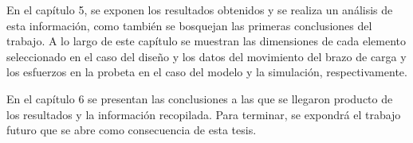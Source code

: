 En el capítulo 5, se exponen los resultados obtenidos y se realiza un análisis de esta información, como también se bosquejan las primeras conclusiones del trabajo. A lo largo de este capítulo se muestran las dimensiones de cada elemento seleccionado en el caso del diseño y los datos del movimiento del brazo de carga y los esfuerzos en la probeta en el caso del modelo y la simulación, respectivamente.

En el capítulo 6 se presentan las conclusiones a las que se llegaron producto de los resultados y la información recopilada. Para terminar, se expondrá el trabajo futuro que se abre como consecuencia de esta tesis.




